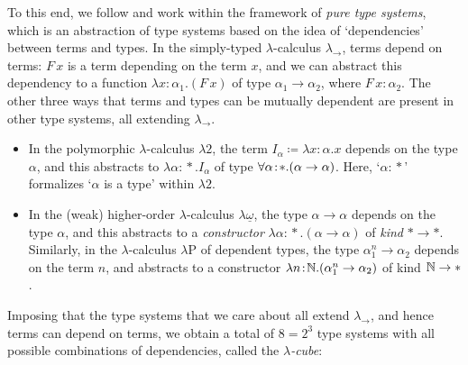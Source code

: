\documentclass[reqno, twoside]{article}
\begin{document}
    To this end, we follow \cite{Bar91} and work within the framework of \textit{pure type systems}, which is an abstraction of type systems based on the idea of `dependencies' between terms and types. In the simply-typed $\lambda$-calculus $\lambda_\rightarrow$, terms depend on terms: $F\,x$ is a term depending on the term $x$, and we can abstract this dependency to a function $\lambda x\!:\!\alpha_1.(F\,x)$ of type $\alpha_1\rightarrow\alpha_2$, where $F\,x\!:\!\alpha_2$. The other three ways that terms and types can be mutually dependent are present in other type systems, all extending $\lambda_\rightarrow$.
    \begin{itemize}
        \item In the polymorphic $\lambda$-calculus $\lambda2$, the term $I_\alpha\coloneqq\lambda x\!:\!\alpha.x$ depends on the type $\alpha$, and this abstracts to $\lambda\alpha\!:\!\ast.I_\alpha$ of type $\forall\alpha\!:\!\ast.(\alpha\rightarrow\alpha)$. Here, `$\alpha\!:\!\ast$' formalizes `$\alpha$ is a type' within $\lambda2$.
            \vspace{-0.05in}
        \item In the (weak) higher-order $\lambda$-calculus $\lambda\underline{\omega}$, the type $\alpha\rightarrow\alpha$ depends on the type $\alpha$, and this abstracts to a \textit{constructor} $\lambda\alpha\!:\!\ast.(\alpha\rightarrow\alpha)$ of \textit{kind} $\ast\to\ast$. Similarly, in the $\lambda$-calculus $\lambda\mathrm{P}$ of dependent types, the type $\alpha_1^n\to\alpha_2$ depends on the term $n$, and abstracts to a constructor $\lambda n\!:\!\mathbb{N}.(\alpha_1^n\to\alpha_2)$ of kind $\mathbb{N}\to\ast$.
    \end{itemize}
    Imposing that the type systems that we care about all extend $\lambda_\rightarrow$, and hence terms can depend on terms, we obtain a total of $8=2^3$ type systems with all possible combinations of dependencies, called the \textit{$\lambda$-cube}:
    \vspace{-0.05in}
\end{document}

